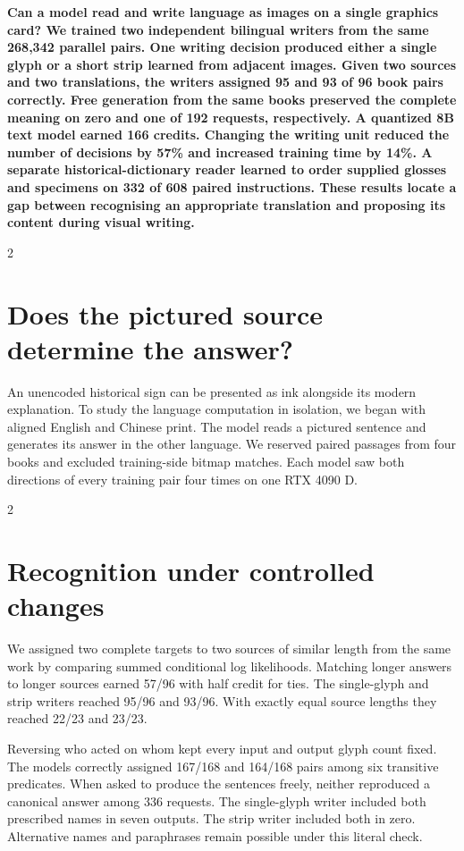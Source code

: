 \noindent\textbf{Can a model read and write language as images on a single graphics card? We trained two independent bilingual writers from the same 268,342 parallel pairs. One writing decision produced either a single glyph or a short strip learned from adjacent images. Given two sources and two translations, the writers assigned 95 and 93 of 96 book pairs correctly. Free generation from the same books preserved the complete meaning on zero and one of 192 requests, respectively. A quantized 8B text model earned 166 credits. Changing the writing unit reduced the number of decisions by 57\% and increased training time by 14\%. A separate historical-dictionary reader learned to order supplied glosses and specimens on 332 of 608 paired instructions. These results locate a gap between recognising an appropriate translation and proposing its content during visual writing.}\par
\begin{multicols}{2}
\section*{Does the pictured source determine the answer?}
An unencoded historical sign can be presented as ink alongside its modern explanation. To study the language computation in isolation, we began with aligned English and Chinese print. The model reads a pictured sentence and generates its answer in the other language. We reserved paired passages from four books and excluded training-side bitmap matches. Each model saw both directions of every training pair four times on one RTX 4090 D.
\end{multicols}
\begin{multicols}{2}
\section*{Recognition under controlled changes}
We assigned two complete targets to two sources of similar length from the same work by comparing summed conditional log likelihoods. Matching longer answers to longer sources earned 57/96 with half credit for ties. The single-glyph and strip writers reached 95/96 and 93/96. With exactly equal source lengths they reached 22/23 and 23/23.

Reversing who acted on whom kept every input and output glyph count fixed. The models correctly assigned 167/168 and 164/168 pairs among six transitive predicates. When asked to produce the sentences freely, neither reproduced a canonical answer among 336 requests. The single-glyph writer included both prescribed names in seven outputs. The strip writer included both in zero. Alternative names and paraphrases remain possible under this literal check.
\end{multicols}
